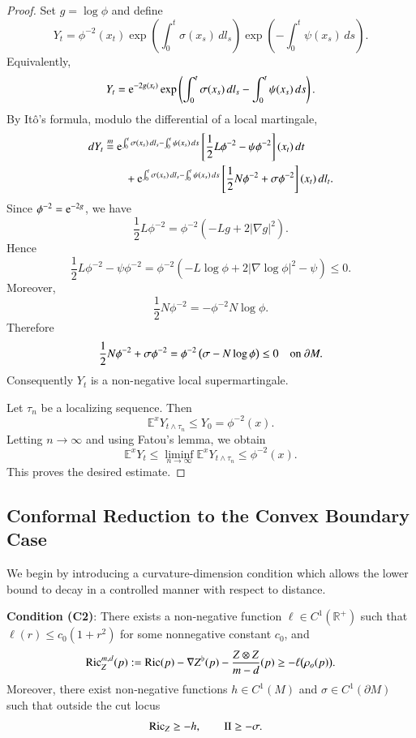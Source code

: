 \documentclass[11pt,twoside, reqno]{article}
\def\e{{\rm e}}
\def\mathpal#1{\mathop{\mathchoice{\text{\rm #1}}%
   {\text{\rm #1}}{\text{\rm #1}}%
   {\text{\rm #1}}}\nolimits}
\newcommand\Ric{\mathpal{Ric}}
\newcommand\1{\mathbbm{1}}
\newcommand\R{\mathbb{R}}
\newcommand\II{\mathrm{II}}
\theoremstyle{definition}
\numberwithin{equation}{section}
\def \e{{\rm e}}
\begin{document}
\begin{proof}
Set \(g=\log\phi\) and define
\[
Y_t
=
\phi^{-2}(x_t)
\exp \left( \int_0^t \sigma(x_s)\,dl_s \right)
\exp \left( - \int_0^t \psi(x_s)\,ds \right).
\]
Equivalently,
\[
Y_t
=
\e^{-2g(x_t)}
\exp \left(
        \int_0^t \sigma(x_s)\,dl_s
        -
        \int_0^t \psi(x_s)\,ds
\right).
\]
By Itô's formula, modulo the differential of a local martingale,
\[
\begin{aligned}
dY_t
\overset{m}{=}
&\;
\e^{\int_0^t \sigma(x_s)\,dl_s-\int_0^t\psi(x_s)\,ds}
\left[
        \frac12 L\phi^{-2}-\psi\phi^{-2}
\right](x_t)\,dt
\\
&\quad
+
\e^{\int_0^t \sigma(x_s)\,dl_s-\int_0^t\psi(x_s)\,ds}
\left[
        \frac12 N\phi^{-2}+\sigma\phi^{-2}
\right](x_t)\,dl_t .
\end{aligned}
\]
Since \(\phi^{-2}=\e^{-2g}\), we have
\[
        \frac12 L\phi^{-2}
        =
        \phi^{-2}\left(-Lg+2|\nabla g|^2\right).
\]
Hence
\[
        \frac12 L\phi^{-2}-\psi\phi^{-2}
        =
        \phi^{-2}
        \left(
        -L\log\phi+2|\nabla\log\phi|^2-\psi
        \right)
        \leq0.
\]
Moreover,
\[
        \frac12 N\phi^{-2}
        =
        -\phi^{-2}N\log\phi.
\]
Therefore
\[
        \frac12 N\phi^{-2}+\sigma\phi^{-2}
        =
        \phi^{-2}\left(\sigma-N\log\phi\right)
        \leq0
        \quad \hbox{on } \partial M .
\]
Consequently \(Y_t\) is a non-negative local supermartingale.

Let \(\tau_n\) be a localizing sequence. Then
\[
        \mathbb E^x Y_{t\wedge\tau_n}
        \leq
        Y_0
        =
        \phi^{-2}(x).
\]
Letting \(n\to\infty\) and using Fatou's lemma, we obtain
\[
        \mathbb E^xY_t
        \leq
        \liminf_{n\to\infty}
        \mathbb E^xY_{t\wedge\tau_n}
        \leq
        \phi^{-2}(x).
\]
This proves the desired estimate.
\end{proof}




\subsection{Conformal Reduction to the Convex Boundary Case}
We begin by introducing a curvature-dimension condition which allows the lower bound to decay in a controlled manner with respect to distance.

\begin{mdframed}  
\textbf{Condition (C2)}:  
There exists a non‑negative function $\ell \in C^1(\R^+)$ such that $\ell(r)\leq c_0(1+r^2)$ for some nonnegative constant $c_0$, and  
\begin{align}
	\Ric_Z^{m,d}(p):=\Ric(p)-\nabla Z^\flat(p)-\frac{Z\otimes Z}{m-d}(p)\geq -\ell\bigl(\rho_o( p)\bigr). 
\end{align}
Moreover, there exist non‑negative functions $h\in C^1(M)$ and $\sigma\in C^1(\partial M)$ such that outside the cut locus  
 \begin{align*}
&\Ric_Z\geq -h, \qquad \II\geq -\sigma . 
\end{align*}
\end{mdframed}
\end{document}
